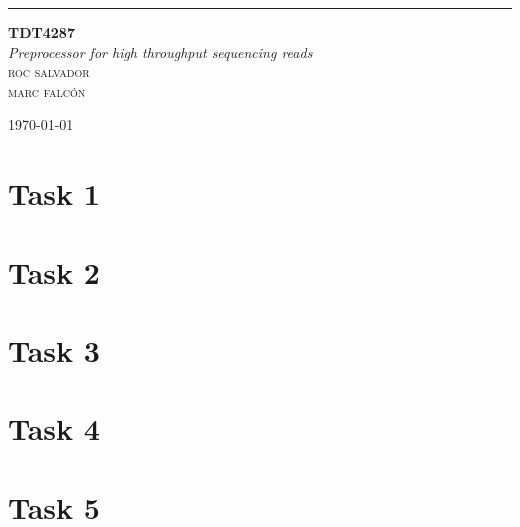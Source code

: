 \documentclass[a4paper,10pt]{article}
\begin{document}
\begin{titlepage} %
	
	\raggedleft %
	
	\rule{1pt}{\textheight} %
	\hspace{0.02\textwidth} %
	\parbox[b]{0.75\textwidth}{ %
		
		{\Huge\bfseries TDT4287}\\[2\baselineskip] %
		{\large\textit{Preprocessor for high throughput sequencing reads}}\\[4\baselineskip] %
		{\Large\textsc{roc salvador\\marc falcón}} %
		
		\vspace{0.5\textheight} %
		
		{\noindent \today}\\[\baselineskip] %
	}

\end{titlepage}


\tableofcontents

\newpage

\section{Task 1}

\newpage

\section{Task 2}

\newpage

\section{Task 3}

\newpage

\section{Task 4}

\newpage

\section{Task 5}
\end{document}
